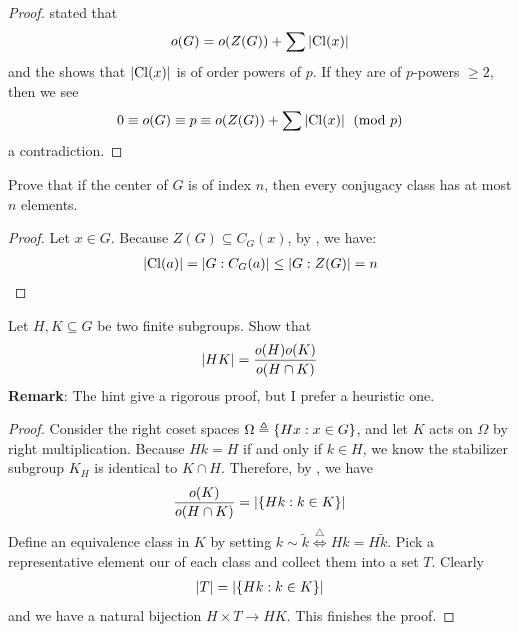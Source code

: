 \documentclass{report}
\begin{document}
\begin{proof}
   stated that 
\begin{align}
\label{EQoG}
  o(G)= o(Z(G))+ \sum \left|\operatorname{Cl}(x)\right|
\end{align}
and the  shows that $\left|\operatorname{Cl}(x)\right|$ is of order powers of $p$. If they are of $p$-powers  $\geq 2$, then  we see 
\begin{align*}
0\equiv o(G) \equiv p \equiv o(Z(G))+ \sum \left|\operatorname{Cl}(x)\right|\pmod{p}
\end{align*}
a contradiction. 
\end{proof}
\begin{question}{}{}
Prove that if the center of $G$ is of index $n$, then every conjugacy class has at most  $n$ elements. 
\end{question}
\begin{proof}
Let $x \in G$. Because $Z(G) \subseteq C_G(x)$, by , we have: 
\begin{align*}
\left|\operatorname{Cl}(a)\right| = \left|G : C_G(a)\right| \leq \left|G:Z(G)\right|=n 
\end{align*}
\end{proof}
\begin{question}{}{}
Let $H,K\subseteq G$ be two finite subgroups. Show that 
\begin{align*}
\left|HK\right|= \frac{o(H)o(K)}{ o(H \cap K)}
\end{align*}
\textbf{Remark}: The hint give a rigorous proof, but I prefer a heuristic one. 
\end{question}
\begin{proof}
Consider the right coset spaces $\Omega \triangleq \left\{ Hx: x \in G \right\}$, and let $K$ acts on  $\Omega$ by right multiplication. Because $Hk =H$ if and only if $k \in H$, we know the stabilizer subgroup $K_H$ is identical to  $K \cap  H$. Therefore, by , we have 
\begin{align*}
\frac{o(K)}{o(H \cap K)}= \left|\left\{ Hk: k \in K \right\}\right|
\end{align*}
Define an equivalence class in $K$ by setting  $k \sim \tilde{k}\overset{\triangle}{\iff } Hk = H \tilde{k}$. Pick a representative element our of each class and collect them into a set $T$. Clearly 
\begin{align*}
\left|T\right|= \left|\left\{ Hk:k \in K \right\}\right|
\end{align*}
and we have a natural bijection $H \times T \rightarrow HK$. This finishes the proof. 
\end{proof}
\end{document}
